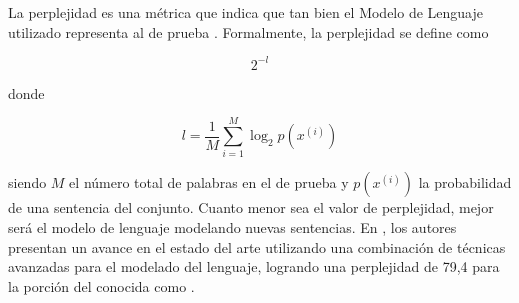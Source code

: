 La perplejidad es una m\'etrica que indica que tan bien el Modelo de Lenguaje utilizado representa al  
de prueba \cite{RosenfeldStatistical1997}. Formalmente, la perplejidad se define como

\begin{equation*}
    2^{-l}
\end{equation*}

donde

\begin{equation*}
    l = \frac{1}{M}\sum_{i=1}^{M}\log_2p(x^{(i)})
\end{equation*}

siendo $M$ el n\'umero total de palabras en el  de prueba y $p(x^{(i)})$ la probabilidad de una 
sentencia del conjunto. Cuanto menor sea el valor de perplejidad, mejor ser\'a el modelo de lenguaje modelando
nuevas sentencias. En \cite{MikolovEmpirical2011}, los autores presentan un avance en el estado del arte
utilizando una combinaci\'on de t\'ecnicas avanzadas para el modelado del lenguaje, logrando una perplejidad
de 79,4 para la porci\'on del  conocida como .
